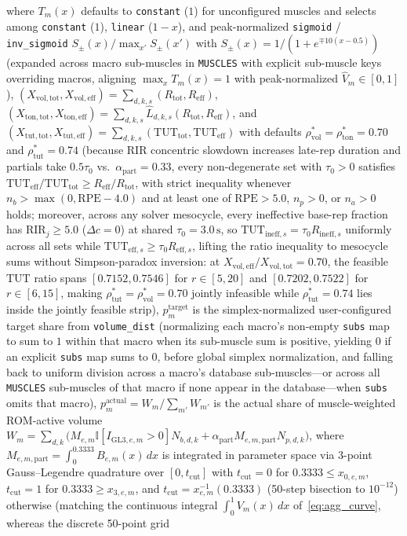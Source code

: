 \documentclass[10pt,twocolumn,letterpaper]{article}
\theoremstyle{plain}
\theoremstyle{definition}
\begin{document}
where $T_m(x)$ defaults to \texttt{constant} ($1$) for unconfigured muscles and selects among \texttt{constant} ($1$), \texttt{linear} ($1 - x$), and peak-normalized \texttt{sigmoid} / \texttt{inv\_sigmoid} $S_\pm(x)/\max_{x'} S_\pm(x')$ with $S_\pm(x) = 1 / (1 + e^{\mp 10(x - 0.5)})$ (expanded across macro sub-muscles in \texttt{MUSCLES} with explicit sub-muscle keys overriding macros, aligning $\max_x T_m(x) = 1$ with peak-normalized $\hat{V}_m \in [0, 1]$), $(X_{\mathrm{vol,tot}}, X_{\mathrm{vol,eff}}) = \sum_{d,k,s}(R_{\mathrm{tot}}, R_{\mathrm{eff}})$, $(X_{\mathrm{ton,tot}}, X_{\mathrm{ton,eff}}) = \sum_{d,k,s}\hat{L}_{d,k,s}(R_{\mathrm{tot}}, R_{\mathrm{eff}})$, and $(X_{\mathrm{tut,tot}}, X_{\mathrm{tut,eff}}) = \sum_{d,k,s}(\mathrm{TUT}_{\mathrm{tot}}, \mathrm{TUT}_{\mathrm{eff}})$ with defaults $\rho_{\mathrm{vol}}^* = \rho_{\mathrm{ton}}^* = 0.70$ and $\rho_{\mathrm{tut}}^* = 0.74$ (because RIR concentric slowdown increases late-rep duration and partials take $0.5\tau_0$ vs.\ $\alpha_{\mathrm{part}} = 0.33$, every non-degenerate set with $\tau_0 > 0$ satisfies $\mathrm{TUT}_{\mathrm{eff}}/\mathrm{TUT}_{\mathrm{tot}} \ge R_{\mathrm{eff}}/R_{\mathrm{tot}}$, with strict inequality whenever $n_b > \max(0, \mathrm{RPE} - 4.0)$ and at least one of $\mathrm{RPE} > 5.0$, $n_p > 0$, or $n_a > 0$ holds; moreover, across any solver mesocycle, every ineffective base-rep fraction has $\mathrm{RIR}_j \ge 5.0$ ($\Delta c = 0$) at shared $\tau_0 = 3.0\,\text{s}$, so $\mathrm{TUT}_{\mathrm{ineff},s} = \tau_0 R_{\mathrm{ineff},s}$ uniformly across all sets while $\mathrm{TUT}_{\mathrm{eff},s} \ge \tau_0 R_{\mathrm{eff},s}$, lifting the ratio inequality to mesocycle sums without Simpson-paradox inversion: at $X_{\mathrm{vol,eff}}/X_{\mathrm{vol,tot}} = 0.70$, the feasible $\mathrm{TUT}$ ratio spans $[0.7152, 0.7546]$ for $r \in [5, 20]$ and $[0.7202, 0.7522]$ for $r \in [6, 15]$, making $\rho_{\mathrm{tut}}^* = \rho_{\mathrm{vol}}^* = 0.70$ jointly infeasible while $\rho_{\mathrm{tut}}^* = 0.74$ lies inside the jointly feasible strip), $p_m^{\mathrm{target}}$ is the simplex-normalized user-configured target share from \texttt{volume\_dist} (normalizing each macro's non-empty \texttt{subs} map to sum to $1$ within that macro when its sub-muscle sum is positive, yielding $0$ if an explicit \texttt{subs} map sums to $0$, before global simplex normalization, and falling back to uniform division across a macro's database sub-muscles—or across all \texttt{MUSCLES} sub-muscles of that macro if none appear in the database—when \texttt{subs} omits that macro), $p_m^{\mathrm{actual}} = W_m / \sum_{m'} W_{m'}$ is the actual share of muscle-weighted ROM-active volume $W_m = \sum_{d,k} \bigl( M_{e,m} \mathbb{I}[I_{\mathrm{GL3},e,m} > 0] N_{b,d,k} + \alpha_{\mathrm{part}} M_{e,m,\mathrm{part}} N_{p,d,k} \bigr)$, where $M_{e,m,\mathrm{part}} = \int_0^{0.3333} B_{e,m}(x)\,dx$ is integrated in parameter space via 3-point Gauss--Legendre quadrature over $[0, t_{\mathrm{cut}}]$ with $t_{\mathrm{cut}} = 0$ for $0.3333 \le x_{0,e,m}$, $t_{\mathrm{cut}} = 1$ for $0.3333 \ge x_{3,e,m}$, and $t_{\mathrm{cut}} = x_{e,m}^{-1}(0.3333)$ (50-step bisection to $10^{-12}$) otherwise (matching the continuous integral $\int_0^1 V_m(x)\,dx$ of~\eqref{eq:agg_curve}, whereas the discrete 50-point grid 
\end{document}
